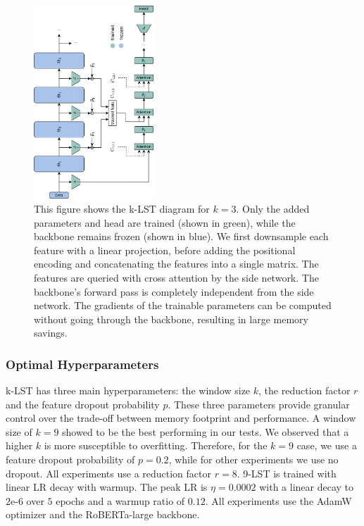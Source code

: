 \begin{figure}[htb]
    \centering
    \includegraphics[width=0.4\textwidth, angle=-90]{assets/images/k-LST.png}
    \caption{This figure shows the k-LST diagram for \(k = 3\). Only the added parameters and head are trained (shown in green), while the backbone remains frozen (shown in blue). We first downsample each feature with a linear projection, before adding the positional encoding and concatenating the features into a single matrix. The features are queried with cross attention by the side network. The backbone's forward pass is completely independent from the side network. The gradients of the trainable parameters can be computed without going through the backbone, resulting in large memory savings.}
    \label{fig:k-LST}
\end{figure}


\subsubsection{Optimal Hyperparameters}\label{section:lst-parameters}

k-LST has three main hyperparameters: the window size \(k\), the reduction factor \(r\) and the feature dropout probability \(p\). These three parameters provide granular control over the trade-off between memory footprint and performance. A window size of \(k = 9\) showed to be the best performing in our tests. We observed that a higher \(k\) is more susceptible to overfitting. Therefore, for the \(k = 9\) case, we use a feature dropout probability of \(p = 0.2\), while for other experiments we use no dropout. All experiments use a reduction factor \(r = 8\). 9-LST is trained with linear LR decay with warmup. The peak LR is \(\eta = 0.0002\) with a linear decay to \(\text{{2e-6}}\) over \(5\) epochs and a warmup ratio of \(0.12\). All experiments use the AdamW optimizer \cite{DBLP:journals/corr/abs-1711-05101} and the RoBERTa-large \cite{roberta} backbone.


